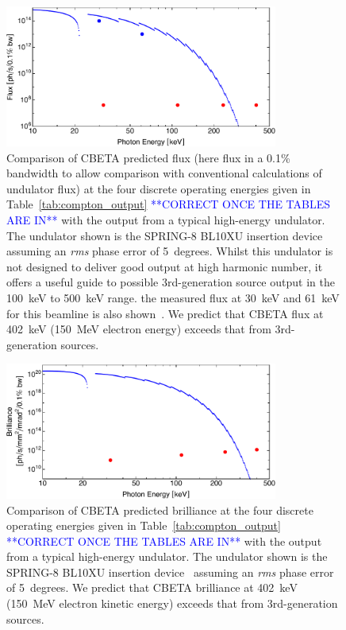 \documentclass[../main.tex]{subfiles}
\begin{document}
\begin{figure}[!htb]
\centering
\includegraphics[width=0.8\textwidth]{Figures/CBETA_Inverse_Compton_Source_Design/spring8bl10fluxplot.pdf}
\caption{Comparison of CBETA predicted flux (here flux in a 0.1\% bandwidth to allow comparison with conventional calculations of undulator flux) at the four discrete operating energies given in Table~\ref{tab:compton_output} \textcolor{blue}{**CORRECT ONCE THE TABLES ARE IN**} with the output from a typical high-energy undulator. The undulator shown is the SPRING-8 BL10XU insertion device~\cite{spring8beamlines} assuming an \textit{rms} phase error of 5~degrees. Whilst this undulator is not designed to deliver good output at high harmonic number, it offers a useful guide to possible 3rd-generation source output in the 100~keV to 500~keV range. the measured flux at 30~keV and 61~keV for this beamline is also shown~\cite{spring8beamlines}. We predict that CBETA flux at 402~keV (150~MeV electron energy) exceeds that from 3rd-generation sources.}
\label{fig:ICS_vs_SPRING8_Undulator_Flux}
\end{figure}

\begin{figure}[!htb]
\centering
\includegraphics[width=0.8\textwidth]{Figures/CBETA_Inverse_Compton_Source_Design/spring8bl10brillianceplot.pdf}
\caption{Comparison of CBETA predicted brilliance at the four discrete operating energies given in Table~\ref{tab:compton_output}  \textcolor{blue}{**CORRECT ONCE THE TABLES ARE IN**} with the output from a typical high-energy undulator. The undulator shown is the SPRING-8 BL10XU insertion device~\cite{spring8beamlines} assuming an \textit{rms} phase error of 5~degrees. We predict that CBETA brilliance at 402~keV (150~MeV electron kinetic energy) exceeds that from 3rd-generation sources.}
\label{fig:ICS_vs_SPRING8_Undulator_Brilliance}
\end{figure}
\end{document}
